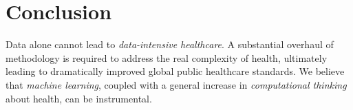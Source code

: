 \documentclass[twocolumn]{article}
\begin{document}
\section{Conclusion}
Data alone cannot lead to \textit{data-intensive healthcare}. A substantial overhaul of methodology is required to address the real complexity of health, ultimately leading to dramatically improved global public healthcare standards. We believe that \textit{machine learning}, coupled with a general increase in \textit{computational thinking} about health, can be instrumental.



\end{document}
